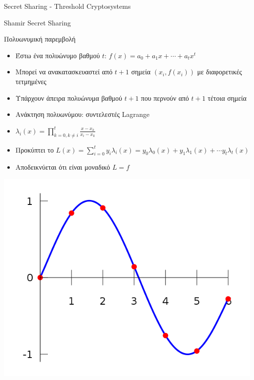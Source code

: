 \documentclass[handout]{beamer}
\begin{document}
\begin{section}{Secret Sharing - Threshold Cryptosystems}
\begin{frame}[allowframebreaks]{Shamir Secret Sharing}

\begin{block}{Πολυωνυμική παρεμβολή}
\begin{itemize}
\item Έστω ένα πολυώνυμο βαθμού $t$: $f(x) = a_0+a_1x+\cdots+a_tx^t$
\item Μπορεί να ανακατασκευαστεί από $t+1$ σημεία $(x_i,f(x_i))$ με διαφορετικές τετμημένες
\item Υπάρχουν άπειρα πολυώνυμα βαθμού $t+1$ που περνούν από 
$t+1$ τέτοια σημεία
\item Ανάκτηση πολυωνύμου: συντελεστές Lagrange
\item $\lambda_i(x) = \prod_{k=0, k \neq i}^t \frac{x-x_k}{x_i-x_k}$
\item Προκύπτει το $L(x) = \sum_{i=0}^t y_i \lambda_i(x) = y_0 \lambda_0(x) + y_1 \lambda_1(x) + \cdots y_t \lambda_t (x) $
\item Αποδεικνύεται ότι είναι μοναδικό $L = f$
\end{itemize}
\end{block}
\framebreak

\includegraphics[scale=0.4]{polynomialinterpolation.png}

\framebreak


\end{frame}
\end{section}
\end{document}
